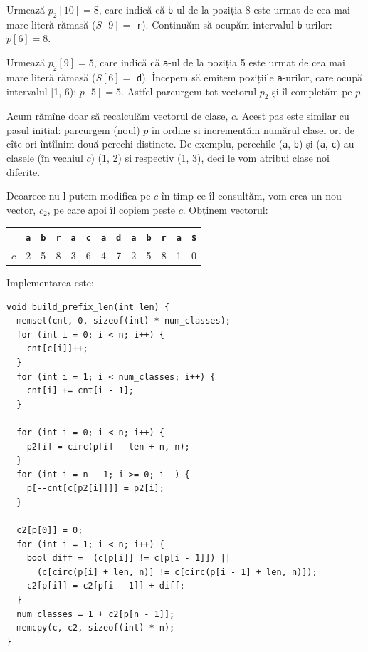 \documentclass[../main.tex]{subfiles}
\begin{document}
Urmează $p_2[10] = 8$, care indică că \texttt{b}-ul de la poziția 8 este urmat de cea mai mare literă rămasă ($S[9] =$ \texttt{r}). Continuăm să ocupăm intervalul \texttt{b}-urilor: $p[6] = 8$.

Urmează $p_2[9] = 5$, care indică că \texttt{a}-ul de la poziția 5 este urmat de cea mai mare literă rămasă ($S[6] =$ \texttt{d}). Începem să emitem pozițiile \texttt{a}-urilor, care ocupă intervalul [1, 6): $p[5] = 5$. Astfel parcurgem tot vectorul $p_2$ și îl completăm pe $p$.

Acum rămîne doar să recalculăm vectorul de clase, $c$. Acest pas este similar cu pasul inițial: parcurgem (noul) $p$ în ordine și incrementăm numărul clasei ori de cîte ori întîlnim două perechi distincte. De exemplu, perechile (\texttt{a}, \texttt{b}) și (\texttt{a}, \texttt{c}) au clasele (în vechiul $c$) (1, 2) și respectiv (1, 3), deci le vom atribui clase noi diferite.

Deoarece nu-l putem modifica pe $c$ în timp ce îl consultăm, vom crea un nou vector, $c_2$, pe care apoi îl copiem peste $c$. Obținem vectorul:

\begin{table}[H]
  \centering
  \begin{tabular}{c|cccccccccccc}
    & \texttt{a} & \texttt{b} & \texttt{r} & \texttt{a} & \texttt{c} & \texttt{a} & \texttt{d} & \texttt{a} & \texttt{b} & \texttt{r} & \texttt{a} & \texttt{\$} \\
    \hline
    $c$ & 2 & 5 & 8 & 3 & 6 & 4 & 7 & 2 & 5 & 8 & 1 & 0 \\
  \end{tabular}
\end{table}

Implementarea este:

\begin{verbatim}
void build_prefix_len(int len) {
  memset(cnt, 0, sizeof(int) * num_classes);
  for (int i = 0; i < n; i++) {
    cnt[c[i]]++;
  }
  for (int i = 1; i < num_classes; i++) {
    cnt[i] += cnt[i - 1];
  }

  for (int i = 0; i < n; i++) {
    p2[i] = circ(p[i] - len + n, n);
  }
  for (int i = n - 1; i >= 0; i--) {
    p[--cnt[c[p2[i]]]] = p2[i];
  }

  c2[p[0]] = 0;
  for (int i = 1; i < n; i++) {
    bool diff =  (c[p[i]] != c[p[i - 1]]) ||
      (c[circ(p[i] + len, n)] != c[circ(p[i - 1] + len, n)]);
    c2[p[i]] = c2[p[i - 1]] + diff;
  }
  num_classes = 1 + c2[p[n - 1]];
  memcpy(c, c2, sizeof(int) * n);
}
\end{verbatim}
\end{document}
